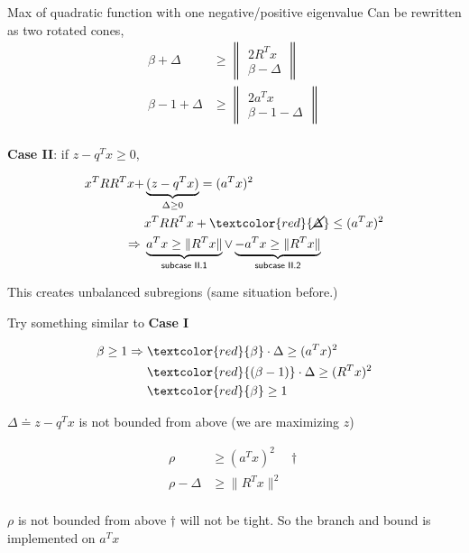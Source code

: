 \documentclass[aspectratio=1610, 10pt]{beamer}
\newcommand{\red}[1]{\textcolor{red}{#1}}
\begin{document}
\begin{frame}[allowframebreaks]{Max of quadratic function with one negative/positive eigenvalue}
  Can be rewritten as two rotated cones,
  \begin{align*}
    \beta + \Delta     & \ge \left\|\begin{array}{c} 2R^Tx \\ \beta - \Delta \end{array}\right\| \\
    \beta - 1 + \Delta & \ge \left\|\begin{array}{c} 2a^Tx \\ \beta - 1 - \Delta \end{array}\right\| \\
  \end{align*}
  \framebreak

  \textbf{Case II}: if \(z - q^Tx \ge 0\),

  \begin{align*}
    x^TRR^Tx +     & \underbrace{(z - q^Tx)}_{\Delta \ge 0} = (a^Tx)^2      \\
                   & x^TRR^Tx + \red{\cancel{\Delta}} \le (a^Tx)^2          \\
    \Rightarrow \; & \underbrace{a^Tx \ge \|R^Tx\|}_{\textsf{subcase II.1}}
    \vee \underbrace{- a^Tx \ge \|R^Tx\|}_{\textsf{subcase II.2}}           \\
  \end{align*}


  This creates unbalanced subregions (same situation before.)

  \framebreak

  Try something similar to \textbf{Case I}

  \begin{align*}
    \beta \ge 1 \Rightarrow \; & \red{\beta}\cdot\Delta \ge (a^Tx)^2       \\
                               & \red{(\beta - 1)}\cdot\Delta \ge (R^Tx)^2 \\
                               & \red{\beta} \ge 1
  \end{align*}

  \(\Delta \doteq z - q^Tx\) is not bounded from above (we are maximizing \(z\))


  \begin{align*}
    \rho            & \ge (a^Tx)^2 \quad \dagger \\
    \rho  -  \Delta & \ge \|R^Tx\|^2             \\
  \end{align*}

  \(\rho\) is not bounded from above \(\dagger\) will not be tight.
  So the branch and bound is implemented on \(a^Tx \)

\end{frame}


%   
%   
\end{document}
